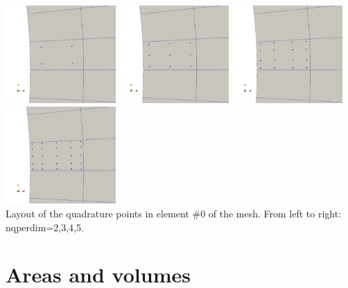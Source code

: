 \begin{center}
\includegraphics[width=4.2cm]{python_codes/fieldstone_152/images/nq4}
\includegraphics[width=4.2cm]{python_codes/fieldstone_152/images/nq9}
\includegraphics[width=4.2cm]{python_codes/fieldstone_152/images/nq16}
\includegraphics[width=4.2cm]{python_codes/fieldstone_152/images/nq25}\\
{\captionfont Layout of the quadrature points in element \#0 of the mesh. 
From left to right: {\python nqperdim=2,3,4,5}.} 
\end{center}



\newpage
\section*{Areas and volumes}


